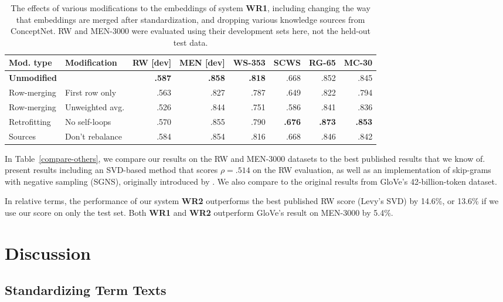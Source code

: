 \documentclass[11pt]{article}
\begin{document}
\begin{table*}[t]
\centering
\begin{tabular}{llrrrrrr}
\toprule
Mod. type       & Modification & RW [dev] & MEN [dev] & WS-353 & SCWS &  RG-65 &  MC-30 \\
\midrule
{\bf Unmodified}&                     & \bf .587 & \bf .858 & \bf .818 &  .668 &   .852 &   .845 \\
Row-merging     & First row only      & .563 &      .827 &    .787 &  .649 &   .822 &   .794 \\
Row-merging     & Unweighted avg.     & .526 &      .844 &    .751 &  .586 &   .841 &   .836 \\
Retrofitting    & No self-loops       & .570 &      .855 &    .790 & \bf .676 & \bf .873 & \bf .853 \\
Sources         & Don't rebalance     & .584 &      .854 &    .816 &  .668 &   .846 &   .842 \\
\bottomrule
\end{tabular}
\caption{
    The effects of various modifications to the embeddings of system {\bf WR1},
    including changing the way that embeddings are merged after
    standardization, and dropping various knowledge sources from ConceptNet.
    RW and MEN-3000 were evaluated using their development sets here,
    not the held-out test data.
}
\label{eval-variations}
\end{table*}

In Table~\ref{compare-others}, we compare our results on the RW and MEN-3000
datasets to the best published results that we know of.
 present results including an SVD-based method
that scores $\rho = .514$ on the RW evaluation, as well as an implementation
of skip-grams with negative sampling (SGNS), originally introduced by
. We also compare to the original results from
GloVe's 42-billion-token dataset.

In relative terms, the performance of our system {\bf WR2} outperforms the best
published RW score (Levy's SVD) by 14.6\%, or 13.6\% if we use our score on only
the test set. Both {\bf WR1} and {\bf WR2} outperform GloVe's result on
MEN-3000 by 5.4\%.

\section{Discussion}

\subsection{Standardizing Term Texts}
\end{document}
